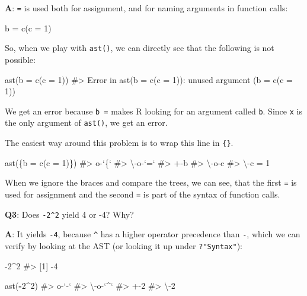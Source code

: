 \documentclass[
]{krantz}
\makeatletter
\newenvironment{Shaded}{\begin{snugshade}}{\end{snugshade}}
\newcommand{\CommentTok}[1]{\textcolor[rgb]{0.56,0.35,0.01}{\textit{#1}}}
\newcommand{\DataTypeTok}[1]{\textcolor[rgb]{0.13,0.29,0.53}{#1}}
\newcommand{\DecValTok}[1]{\textcolor[rgb]{0.00,0.00,0.81}{#1}}
\newcommand{\KeywordTok}[1]{\textcolor[rgb]{0.13,0.29,0.53}{\textbf{#1}}}
\newcommand{\NormalTok}[1]{#1}
\newcommand{\OperatorTok}[1]{\textcolor[rgb]{0.81,0.36,0.00}{\textbf{#1}}}
\newcommand{\StringTok}[1]{\textcolor[rgb]{0.31,0.60,0.02}{#1}}
\newenvironment{kframe}{%
\medskip{}
\setlength{\fboxsep}{.8em}
 \def\at@end@of@kframe{}%
 \ifinner\ifhmode%
  \def\at@end@of@kframe{\end{minipage}}%
  \begin{minipage}{\columnwidth}%
 \fi\fi%
 \def\FrameCommand##1{\hskip\@totalleftmargin \hskip-\fboxsep
 \colorbox{shadecolor}{##1}\hskip-\fboxsep
     \hskip-\linewidth \hskip-\@totalleftmargin \hskip\columnwidth}%
 \MakeFramed {\advance\hsize-\width
   \@totalleftmargin\z@ \linewidth\hsize
   \@setminipage}}%
 {\par\unskip\endMakeFramed%
 \at@end@of@kframe}
\renewenvironment{Shaded}{\begin{kframe}}{\end{kframe}}
\renewcommand{\KeywordTok} [1]{\textcolor[rgb]{0.00,0.44,0.13}{{#1}}}
\renewcommand{\DataTypeTok}[1]{\textcolor[rgb]{0.56,0.13,0.00}{{#1}}}
\renewcommand{\DecValTok}  [1]{\textcolor[rgb]{0.25,0.63,0.44}{{#1}}}
\renewcommand{\StringTok}  [1]{\textcolor[rgb]{0.25,0.44,0.63}{{#1}}}
\renewcommand{\CommentTok} [1]{\textcolor[rgb]{0.38,0.63,0.69}{{#1}}}
\renewcommand{\NormalTok}  [1]{{#1}}
\makeatother
\begin{document}
\textbf{{A}}: \texttt{=} is used both for assignment, and for naming arguments in function calls:

\begin{Shaded}
\begin{Highlighting}[]
\NormalTok{b =}\StringTok{ }\KeywordTok{c}\NormalTok{(}\DataTypeTok{c =} \DecValTok{1}\NormalTok{)}
\end{Highlighting}
\end{Shaded}

So, when we play with \texttt{ast()}, we can directly see that the following is not possible:

\begin{Shaded}
\begin{Highlighting}[]
\KeywordTok{ast}\NormalTok{(}\DataTypeTok{b =} \KeywordTok{c}\NormalTok{(}\DataTypeTok{c =} \DecValTok{1}\NormalTok{))}
\CommentTok{#> Error in ast(b = c(c = 1)): unused argument (b = c(c = 1))}
\end{Highlighting}
\end{Shaded}

We get an error because \texttt{b\ =} makes R looking for an argument called \texttt{b}. Since \texttt{x} is the only argument of \texttt{ast()}, we get an error.

The easiest way around this problem is to wrap this line in \texttt{\{\}}.

\begin{Shaded}
\begin{Highlighting}[]
\KeywordTok{ast}\NormalTok{(\{b =}\StringTok{ }\KeywordTok{c}\NormalTok{(}\DataTypeTok{c =} \DecValTok{1}\NormalTok{)\})}
\CommentTok{#> o-`\{` }
\CommentTok{#> \textbackslash{}-o-`=` }
\CommentTok{#>   +-b }
\CommentTok{#>   \textbackslash{}-o-c }
\CommentTok{#>     \textbackslash{}-c = 1}
\end{Highlighting}
\end{Shaded}

When we ignore the braces and compare the trees, we can see, that the first \texttt{=} is used for assignment and the second \texttt{=} is part of the syntax of function calls.

\textbf{{Q3}}: Does \texttt{-2\^{}2} yield 4 or -4? Why?

\textbf{{A}}: It yields \texttt{-4}, because \texttt{\^{}} has a higher operator precedence than \texttt{-}, which we can verify by looking at the AST (or looking it up under \texttt{?"Syntax"}):

\begin{Shaded}
\begin{Highlighting}[]
\DecValTok{-2}\OperatorTok{^}\DecValTok{2}
\CommentTok{#> [1] -4}

\KeywordTok{ast}\NormalTok{(}\OperatorTok{-}\DecValTok{2}\OperatorTok{^}\DecValTok{2}\NormalTok{)}
\CommentTok{#> o-`-` }
\CommentTok{#> \textbackslash{}-o-`^` }
\CommentTok{#>   +-2 }
\CommentTok{#>   \textbackslash{}-2}
\end{Highlighting}
\end{Shaded}
\end{document}

